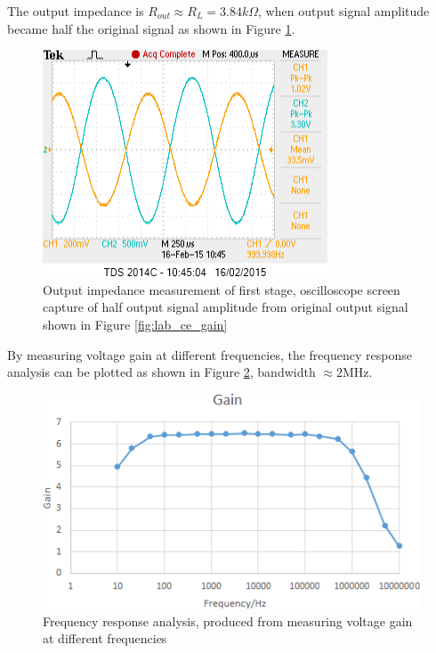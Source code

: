 \documentclass[a4paper,notitlepage,10pt]{report}
\begin{document}
\begin{multicols}{2}
The output impedance is $R_{out} \approx R_L = 3.84k\Omega$, when output signal amplitude became half the original signal as shown in Figure \ref{fig:lab_ce_rout}.
\parskip=0pt

\begin{figure}[H]
	\centering
	\includegraphics[width=0.85\columnwidth]{labcerout}
	\caption{Output impedance measurement of first stage, oscilloscope screen capture of half output signal amplitude from original output signal shown in Figure \ref{fig:lab_ce_gain}}
	\label{fig:lab_ce_rout}
\end{figure}
\parskip=6pt

By measuring voltage gain at different frequencies, the frequency response analysis can be plotted as shown in Figure \ref{fig:lab_ce_freq}, bandwidth $\approx 2$MHz.
\parskip=0pt

\begin{figure}[H]
	\centering
	\includegraphics[width=0.85\columnwidth]{labcefreq}
	\caption{Frequency response analysis, produced from measuring voltage gain at different frequencies}
	\label{fig:lab_ce_freq}
\end{figure}
\parskip=6pt


\end{multicols}
\end{document}
